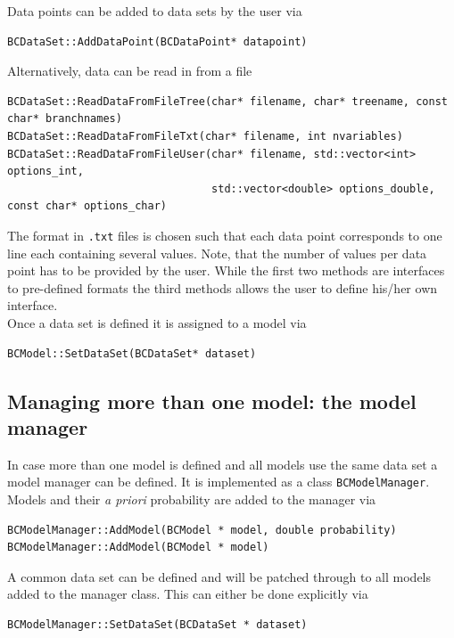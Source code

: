 \documentclass[11pt, a4paper]{article}
\begin{document}
\noindent 
Data points can be added to data sets by the user via 

\begin{verbatim} 
BCDataSet::AddDataPoint(BCDataPoint* datapoint)
\end{verbatim} 

\noindent 
Alternatively, data can be read in from a file
%
\begin{small}
\begin{verbatim}
BCDataSet::ReadDataFromFileTree(char* filename, char* treename, const char* branchnames)
BCDataSet::ReadDataFromFileTxt(char* filename, int nvariables)
BCDataSet::ReadDataFromFileUser(char* filename, std::vector<int> options_int,
                                std::vector<double> options_double, const char* options_char)
\end{verbatim} 
\end{small} 

\noindent 
The format in \verb|.txt| files is chosen such that each data point
corresponds to one line each containing several values. Note, that the
number of values per data point has to be provided by the user. While
the first two methods are interfaces to pre-defined formats the third
methods allows the user to define his/her own interface. \\

\noindent 
Once a data set is defined it is assigned to a model via 
%
\begin{verbatim}
BCModel::SetDataSet(BCDataSet* dataset)
\end{verbatim} 


\subsection{Managing more than one model: the model manager} 

In case more than one model is defined and all models use the same
data set a model manager can be defined. It is implemented as a class
\verb|BCModelManager|. Models and their {\it a priori} probability are
added to the manager via
% 
\begin{verbatim}
BCModelManager::AddModel(BCModel * model, double probability)
BCModelManager::AddModel(BCModel * model)
\end{verbatim} 

\noindent 
A common data set can be defined and will be patched through to all
models added to the manager class. This can either be done explicitly
via
%
\begin{verbatim}
BCModelManager::SetDataSet(BCDataSet * dataset) 
\end{verbatim} 
\end{document}
